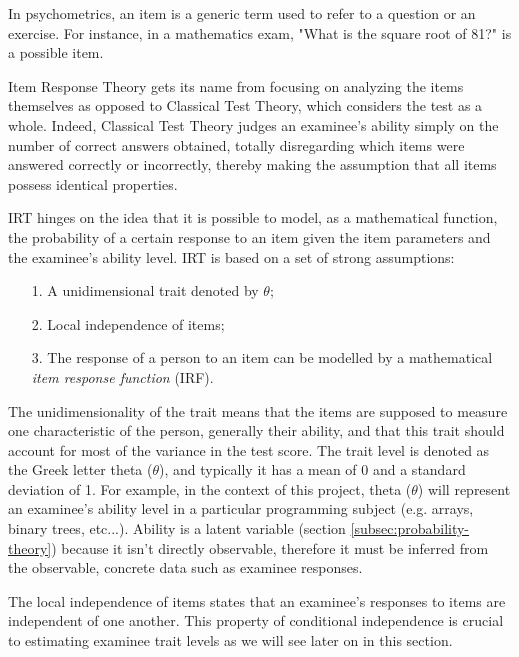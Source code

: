 In psychometrics, an item is a generic term used to refer to a question or an exercise. For instance, in a mathematics exam, "What is the square root of 81?" is a possible item. \newline

Item Response Theory gets its name from focusing on analyzing the items themselves  as opposed to Classical Test Theory, which considers the test as a whole. Indeed, Classical Test Theory judges an examinee's ability simply on the number of correct answers obtained, totally disregarding which items were answered correctly or incorrectly, thereby making the assumption that all items possess identical properties. \newline

IRT hinges on the idea that it is possible to model, as a mathematical function, the probability of a certain response to an item given the item parameters and the examinee's ability level. IRT is based on a set of strong assumptions\cite{IRT-Wiki}:

\begin{itemize}
\item[1.] A unidimensional trait denoted by $\theta$;
\item[2.] Local independence of items;
\item[3.] The response of a person to an item can be modelled by a mathematical \textit{item response function} (IRF).
\end{itemize}

The unidimensionality of the trait means that the items are supposed to measure one characteristic of the person, generally their ability, and that this trait should account for most of the variance in the test score. The trait level is denoted as the Greek letter theta ($\theta$), and typically it has a mean of 0 and a standard deviation of 1. For example, in the context of this project, theta ($\theta$) will represent an examinee's ability level in a particular programming subject (e.g. arrays, binary trees, etc...). Ability is a latent variable (section \ref{subsec:probability-theory}) because it isn't directly observable, therefore it must be inferred from the observable, concrete data such as examinee responses. \newline

The local independence of items states that an examinee's responses to items are independent of one another. This property of conditional independence is crucial to estimating examinee trait levels as we will see later on in this section.\newline

